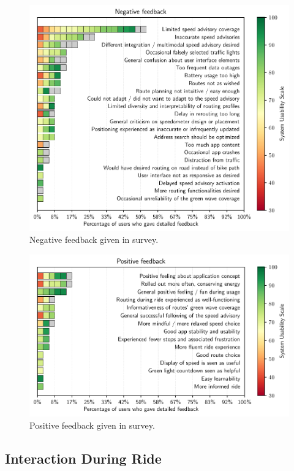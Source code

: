 \begin{figure}[t]
\caption{Negative feedback given in survey.}\label{fig:app-negative-feedback}
\includegraphics[width=\linewidth]{images/app-feedback-negative.pdf}
\end{figure}

\begin{figure}[t]
\caption{Positive feedback given in survey.}\label{fig:app-positive-feedback}
\includegraphics[width=\linewidth]{images/app-feedback-positive.pdf}
\end{figure}


\subsection{Interaction During Ride}

